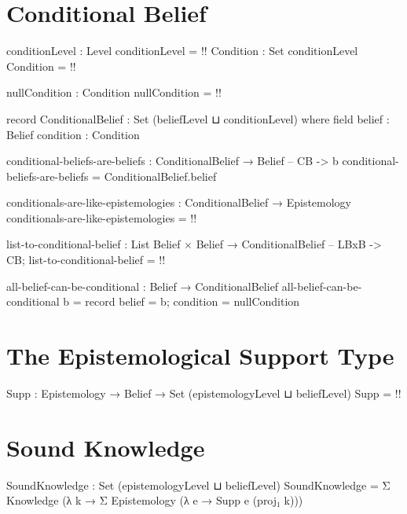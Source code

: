\documentclass{article}
\begin{document}
\section{Conditional Belief}

\begin{code}
conditionLevel : Level
conditionLevel = {!!}
Condition : Set conditionLevel
Condition = {!!}

nullCondition : Condition
nullCondition = {!!}

record ConditionalBelief : Set (beliefLevel ⊔ conditionLevel) where
  field
    belief : Belief
    condition : Condition
\end{code}

\begin{code}
conditional-beliefs-are-beliefs : ConditionalBelief → Belief -- CB -> b
conditional-beliefs-are-beliefs = ConditionalBelief.belief
\end{code}

\begin{code}
conditionals-are-like-epistemologies :
  ConditionalBelief → Epistemology
conditionals-are-like-epistemologies = {!!}
\end{code}

\begin{code}
list-to-conditional-belief :
  List Belief × Belief → ConditionalBelief  -- LBxB -> CB;
list-to-conditional-belief = {!!}
\end{code}

\begin{code}
all-belief-can-be-conditional : Belief → ConditionalBelief
all-belief-can-be-conditional b = record {belief = b; condition = nullCondition}
\end{code}

\section{The Epistemological Support Type}

\begin{code}
Supp : Epistemology → Belief → Set (epistemologyLevel ⊔ beliefLevel)
Supp = {!!}
\end{code}

\section{Sound Knowledge}

\begin{code}
SoundKnowledge : Set (epistemologyLevel ⊔ beliefLevel)
SoundKnowledge = Σ Knowledge (λ k → Σ Epistemology (λ e → Supp e (proj₁ k)))
\end{code}
\end{document}
